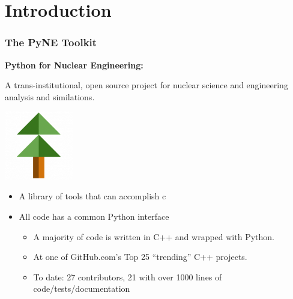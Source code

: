 \documentclass[12pt]{beamer}
\begin{document}
\section{Introduction}
\begin{frame}[fragile]
\frametitle{The PyNE Toolkit}

\centerline{\bf Python for Nuclear Engineering:}
A trans-institutional, open source project for nuclear science and engineering analysis and similations.

\centerline{\includegraphics[width=3cm]{figures/pyne_icon_small.png}}

\begin{itemize}
\item{A library of tools that can accomplish c}
\item{All code has a common Python interface}
\begin{itemize}
\item{A majority of code is written in C++ and wrapped with Python.}
\item{At one of GitHub.com's Top 25 ``trending'' C++ projects.}
\item{To date: 27 contributors, 21 with over 1000 lines of code/tests/documentation}
\end{itemize}
\end{itemize}


\end{frame}
\end{document}
